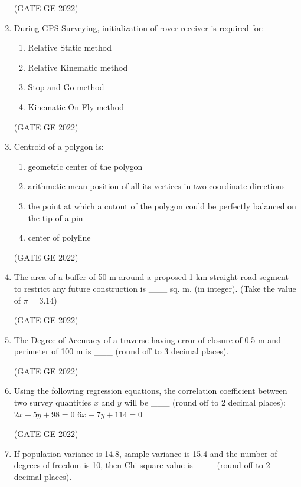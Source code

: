 \documentclass[a4paper, 11pt]{article}
\begin{document}
\begin{enumerate}
\hfill (GATE GE 2022)

\item During GPS Surveying, initialization of rover receiver is required for:
\begin{enumerate}
    \item Relative Static method
    \item Relative Kinematic method
    \item Stop and Go method
    \item Kinematic On Fly method
\end{enumerate}

\hfill (GATE GE 2022)

\item Centroid of a polygon is:
\begin{enumerate}
    \item geometric center of the polygon
    \item arithmetic mean position of all its vertices in two coordinate directions
    \item the point at which a cutout of the polygon could be perfectly balanced on the tip of a pin
    \item center of polyline
\end{enumerate}

\hfill (GATE GE 2022)

\item The area of a buffer of 50 m around a proposed 1 km straight road segment to restrict any future construction is \_\_\_ sq. m. (in integer). (Take the value of $\pi = 3.14$)

\hfill (GATE GE 2022)

\item The Degree of Accuracy of a traverse having error of closure of 0.5 m and perimeter of 100 m is \_\_\_ (round off to 3 decimal places).

\hfill (GATE GE 2022)

\item Using the following regression equations, the correlation coefficient between two survey quantities $x$ and $y$ will be \_\_\_ (round off to 2 decimal places):  
$2x - 5y + 98 = 0$  
$6x - 7y + 114 = 0$

\hfill (GATE GE 2022)

\item If population variance is 14.8, sample variance is 15.4 and the number of degrees of freedom is 10, then Chi-square value is \_\_\_ (round off to 2 decimal places).


\end{enumerate}
\end{document}
